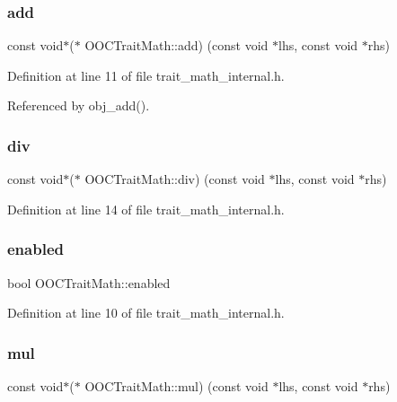 \subsubsection{\texorpdfstring{add}{add}}
{\footnotesize\ttfamily const void$\ast$($\ast$ O\+O\+C\+Trait\+Math\+::add) (const void $\ast$lhs, const void $\ast$rhs)}



Definition at line 11 of file trait\+\_\+math\+\_\+internal.\+h.



Referenced by obj\+\_\+add().

\mbox{\label{structOOCTraitMath_af0d15ca84de8dcdf95ab3a57f567d3c5}} 
\subsubsection{\texorpdfstring{div}{div}}
{\footnotesize\ttfamily const void$\ast$($\ast$ O\+O\+C\+Trait\+Math\+::div) (const void $\ast$lhs, const void $\ast$rhs)}



Definition at line 14 of file trait\+\_\+math\+\_\+internal.\+h.

\mbox{\label{structOOCTraitMath_aa41fea83145bd51c3104475b895126bd}} 
\subsubsection{\texorpdfstring{enabled}{enabled}}
{\footnotesize\ttfamily bool O\+O\+C\+Trait\+Math\+::enabled}



Definition at line 10 of file trait\+\_\+math\+\_\+internal.\+h.

\mbox{\label{structOOCTraitMath_a17d60591640141c98fdba744a034a766}} 
\subsubsection{\texorpdfstring{mul}{mul}}
{\footnotesize\ttfamily const void$\ast$($\ast$ O\+O\+C\+Trait\+Math\+::mul) (const void $\ast$lhs, const void $\ast$rhs)}



